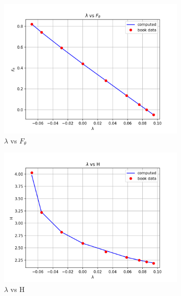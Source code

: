 \begin{figure}[!h]
    \begin{subfigure}{0.45\linewidth}
       \centering
        \includegraphics[scale=0.5]{supporting_documents/02_question_2_and_3_codeDevelopment/03_postProcessing/lambda_vs_F_theta.png}
        \caption{$\lambda$ vs $F_\theta$}
    \end{subfigure}
    \hfill
    \begin{subfigure}{0.45\linewidth}
       \centering
        \includegraphics[scale=0.5]{supporting_documents/02_question_2_and_3_codeDevelopment/03_postProcessing/lambda_vs_H.png}
        \caption{$\lambda$ vs H}
    \end{subfigure}
    \hfill
    \begin{subfigure}{1.00\linewidth}

\end{subfigure}
\end{figure}
